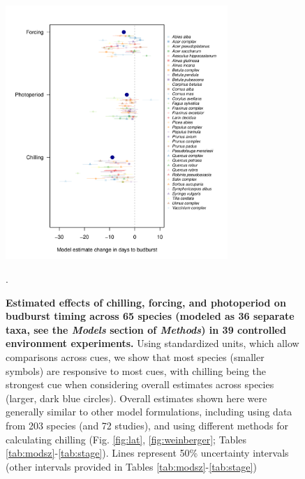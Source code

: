\documentclass{article}
\begin{document}
\begin{figure}[hp!]
\centering
\noindent \includegraphics[width=0.75\textwidth]{..//..//analyses/bb_analysis/figures/muplotspcompexprampfputah_z.pdf}
\caption{\textbf{Estimated effects of chilling, forcing, and photoperiod on budburst timing across 65 species (modeled as 36 separate taxa, see the \emph{Models} section of \emph{Methods}) in 39 controlled environment experiments.} Using standardized units, which allow comparisons across cues, we show that most species (smaller symbols) are responsive to most cues, with chilling being the strongest cue when considering overall estimates across species (larger, dark blue circles). Overall estimates shown here were generally similar to other model formulations, including using data from 203 species (and 72 studies), and using different methods for calculating chilling (Fig. \ref{fig:lat}, \ref{fig:weinberger}; Tables \ref{tab:modsz}-\ref{tab:stage}). Lines represent 50\% uncertainty intervals (other intervals provided in Tables \ref{tab:modsz}-\ref{tab:stage})}.  
\label{fig:mu}
\end{figure}

\newpage
\end{document}
